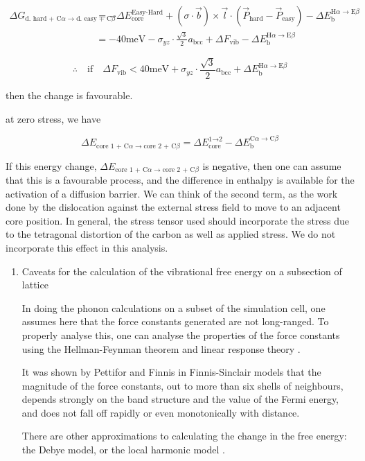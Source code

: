\documentclass[a4paper,11pt]{article}
\numberwithin{equation}{chapter}
\numberwithin{listing}{chapter}
\begin{document}
    \begin{align}
     \Delta G_{ \text{d. hard + C}\alpha \rightarrow \text{d. easy + C}\beta }
       &=   - \Delta E_{\text{core}}^{\text{Easy-Hard}}
    	   + (\sigma \cdot \vec{b}) \times \vec{l}  \cdot ( \vec{P}_{\text{hard}} - \vec{P}_{\text{easy}} )
       - \Delta E_{\text{b}}^{\text{H}\alpha \rightarrow \text{E}\beta}\\
&= - 40\text{meV} - \sigma_{yz} \cdot \frac{\sqrt{3}}{2} a_{\text{bcc} } + \Delta F_{\text{vib} } - \Delta E_{\text{b}}^{\text{H}\alpha \rightarrow \text{E}\beta}
    \end{align}

\[ \therefore \quad \text{if}\quad \Delta F_{\text{vib} } < 40 \text{meV} + \sigma_{yz} \cdot \frac{\sqrt{3}}{2} a_{\text{bcc} } + \Delta E_{\text{b}}^{\text{H}\alpha \rightarrow \text{E}\beta} \]

then the change is favourable.




at zero stress, we have

\begin{equation}
 \Delta E_{ \text{core 1 + C}\alpha \rightarrow \text{core 2 + C}\beta }
   =  \Delta E_{\text{core}}^{\text{1} \rightarrow \text{2}} - \Delta E_{\text{b}}^{\text{C}\alpha \rightarrow \text{C}\beta}
\end{equation}


If this energy change, \(\Delta E_{
    \text{core 1 + C}\alpha \rightarrow \text{core 2 + C}\beta }\) is negative, then one can assume
   that this is a favourable process, and the difference in enthalpy is available for the activation of a
   diffusion barrier. We can think of the second term, as the work done by the dislocation against
   the external stress field to move to an adjacent core position. In general, the stress tensor
   used should incorporate the stress due to the tetragonal distortion of the carbon as well as
   applied stress. We do not incorporate this effect in this analysis.


\begin{enumerate}
\item Caveats for the calculation of the vibrational free energy on a subsection of lattice
\label{sec:orge178851}

In doing the phonon calculations on a subset of the simulation cell, one
assumes here that the force constants generated are not long-ranged. To
properly analyse this, one can analyse the properties of the force constants
using the Hellman-Feynman theorem and linear response theory
\cite{Finnis2003}.

It was shown by Pettifor and Finnis \cite{Pettifor1987} in Finnis-Sinclair
models that the magnitude of the force constants, out to more than six
shells of neighbours, depends strongly on the band structure and the value
of the Fermi energy, and does not fall off rapidly or even monotonically
with distance.

There are other approximations to calculating the change in the free energy:
the Debye model, or the local harmonic model \cite{Garbulsky1996}.
\end{enumerate}
\end{document}
